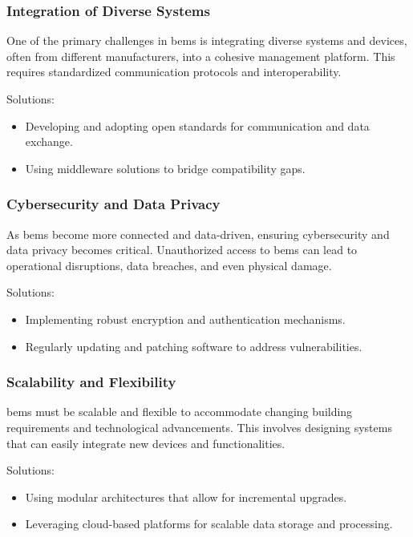 \subsubsection*{Integration of Diverse Systems}

One of the primary challenges in \gls{bems} is integrating diverse systems and devices, often from different manufacturers, into a cohesive management platform. This requires standardized communication protocols and interoperability.

Solutions:
\begin{itemize}
    \item Developing and adopting open standards for communication and data exchange.
    \item Using middleware solutions to bridge compatibility gaps.
\end{itemize}

\subsubsection*{Cybersecurity and Data Privacy}

As \gls{bems} become more connected and data-driven, ensuring cybersecurity and data privacy becomes critical. Unauthorized access to \gls{bems} can lead to operational disruptions, data breaches, and even physical damage.

Solutions:
\begin{itemize}
    \item Implementing robust encryption and authentication mechanisms.
    \item Regularly updating and patching software to address vulnerabilities.
\end{itemize}

\subsubsection*{Scalability and Flexibility}

\gls{bems} must be scalable and flexible to accommodate changing building requirements and technological advancements. This involves designing systems that can easily integrate new devices and functionalities.

Solutions:
\begin{itemize}
    \item Using modular architectures that allow for incremental upgrades.
    \item Leveraging cloud-based platforms for scalable data storage and processing.
\end{itemize}

